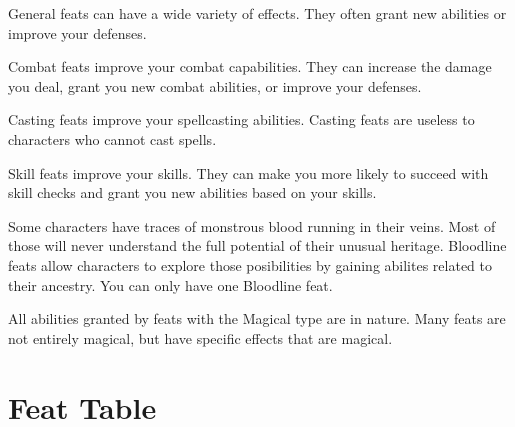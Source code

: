          General feats can have a wide variety of effects.
        They often grant new abilities or improve your defenses.

         Combat feats improve your combat capabilities.
        They can increase the damage you deal, grant you new combat abilities, or improve your defenses.

         Casting feats improve your spellcasting abilities.
        Casting feats are useless to characters who cannot cast spells.

         Skill feats improve your skills.
        They can make you more likely to succeed with skill checks and grant you new abilities based on your skills.

         Some characters have traces of monstrous blood running in their veins.
        Most of those will never understand the full potential of their unusual heritage.
        Bloodline feats allow characters to explore those posibilities by gaining abilites related to their ancestry.
        You can only have one Bloodline feat.

        All abilities granted by feats with the Magical type are  in nature.
        Many feats are not entirely magical, but have specific effects that are magical.

\section{Feat Table}

